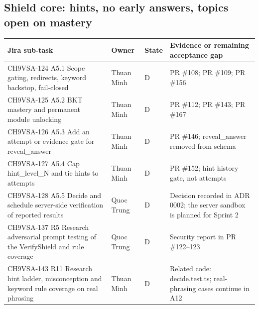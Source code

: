 \documentclass[11pt,a4paper]{article}
\begin{document}
\subsection{Shield core: hints, no early answers, topics open on mastery}
{\small
\begin{longtable}{>{\raggedright\arraybackslash}p{}>{\raggedright\arraybackslash}p{}>{\raggedright\arraybackslash}p{}>{\raggedright\arraybackslash}p{}}
\toprule
\textbf{Jira sub-task} & \textbf{Owner} & \textbf{State} & \textbf{Evidence or remaining acceptance gap} \\
\midrule
\endhead
CH9VSA-124 \newline A5.1 Scope gating, redirects, keyword backstop, fail-closed & Thuan Minh & D & PR \#108; PR \#109; PR \#156 \\
CH9VSA-125 \newline A5.2 BKT mastery and permanent module unlocking & Thuan Minh & D & PR \#112; PR \#143; PR \#167 \\
CH9VSA-126 \newline A5.3 Add an attempt or evidence gate for reveal\_answer & Thuan Minh & D & PR \#146; reveal\_answer removed from schema \\
CH9VSA-127 \newline A5.4 Cap hint\_level\_N and tie hints to attempts & Thuan Minh & D & PR \#152; hint history gate, not attempts \\
CH9VSA-128 \newline A5.5 Decide and schedule server-side verification of reported results & Quoc Trung & D & Decision recorded in ADR 0002; the server sandbox is planned for Sprint 2 \\
CH9VSA-137 \newline R5 Research adversarial prompt testing of the VerifyShield and rule coverage & Quoc Trung & D & Security report in PR \#122--123 \\
CH9VSA-143 \newline R11 Research hint ladder, misconception and keyword rule coverage on real phrasing & Thuan Minh & D & Related code: decide.test.ts; real-phrasing cases continue in A12 \\
\bottomrule
\end{longtable}}
\end{document}

